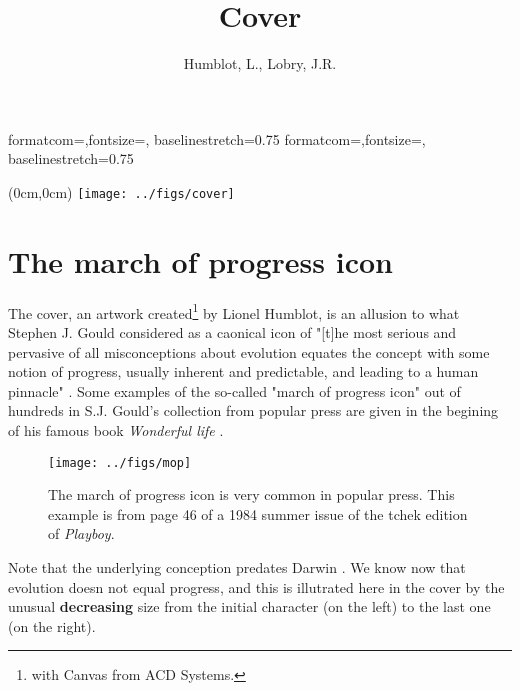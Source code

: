 \documentclass[a4paper]{article}
\title{Cover}
\author{Humblot, L., Lobry, J.R.}
\begin{document}
%
%
{formatcom={\color{Sinput}},fontsize=\footnotesize, baselinestretch=0.75}
{formatcom={\color{Soutput}},fontsize=\footnotesize, baselinestretch=0.75}
%
%
\newcommand{\Rlogo}{\protect\texttt{[image: ../figs/Rlogo.pdf]}}
%
%
\newcommand{\seqinr}{\texttt{seqin\bf{R}}}
\newcommand{\Seqinr}{\texttt{Seqin\bf{R}}}
%
%
%
%
%


\maketitle
\tableofcontents
\newpage

\thispagestyle{empty}
\atxy(0cm,0cm) {\texttt{[image: ../figs/cover]}}
\clearpage
\newpage

\section*{The march of progress icon}

The cover, an artwork created\footnote{
with Canvas from  ACD Systems.}
by Lionel Humblot, is an allusion to what
Stephen J. Gould considered as a caonical icon of "[t]he most serious 
and pervasive of all misconceptions about evolution equates the 
concept with some notion of progress, usually inherent and predictable, 
and leading to a human pinnacle" \cite{GouldSJ1995}. Some examples
of the so-called "march of progress icon" out of hundreds in S.J. 
Gould's collection from popular press are given in the begining of his 
famous book \textit{Wonderful life} \cite{GouldSJ1989}.

\begin{figure}
\texttt{[image: ../figs/mop]}
\caption{The march of progress icon is very common in popular press. This
example is from page 46 of a 1984 summer issue of the tchek edition 
of \textit{Playboy}.}
\label{mop}
\end{figure}

Note that the underlying conception predates Darwin \cite{LovejoyAO1936}.
We know now that evolution doesn not equal progress, and this is illutrated
here in the cover by the unusual \textbf{decreasing} size from the initial 
character (on the left) to the last one (on the right).
\end{document}
